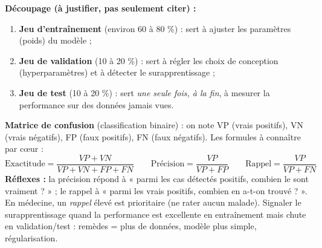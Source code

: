 \documentclass[11pt]{article}
\newcommand{\cle}[1]{{\popxbold\color{popdark}#1}}
\begin{document}
\begin{methode}
\textbf{Découpage (à justifier, pas seulement citer) :}
\begin{enumerate}
\item \textbf{Jeu d'entraînement} (environ 60 à 80 \%) : sert à ajuster les paramètres (poids) du modèle ;
\item \textbf{Jeu de validation} (10 à 20 \%) : sert à régler les choix de conception (hyperparamètres) et à détecter le surapprentissage ;
\item \textbf{Jeu de test} (10 à 20 \%) : sert \emph{une seule fois, à la fin}, à mesurer la performance sur des données jamais vues.
\end{enumerate}
\textbf{Matrice de confusion} (classification binaire) : on note VP (vrais positifs), VN (vrais négatifs), FP (faux positifs), FN (faux négatifs). Les formules à connaître par cœur :
\[ \text{Exactitude} = \frac{VP + VN}{VP + VN + FP + FN} \qquad \text{Précision} = \frac{VP}{VP + FP} \qquad \text{Rappel} = \frac{VP}{VP + FN} \]
\textbf{Réflexes :} la précision répond à « parmi les cas détectés positifs, combien le sont vraiment ? » ; le rappel à « parmi les vrais positifs, combien en a-t-on trouvé ? ». En médecine, un \emph{rappel} élevé est prioritaire (ne rater aucun malade). Signaler le \cle{surapprentissage} quand la performance est excellente en entraînement mais chute en validation/test : remèdes = plus de données, modèle plus simple, régularisation.
\end{methode}
\end{document}
